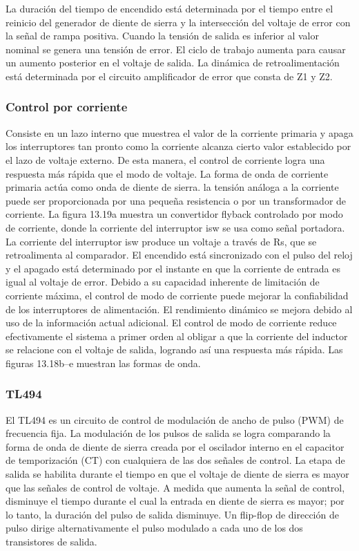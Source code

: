 La duración del tiempo de encendido está determinada por el tiempo entre el reinicio del generador de diente de sierra
y la intersección del voltaje de error con la señal de rampa positiva. 
Cuando la tensión de salida es inferior al valor nominal se genera una tensión de error. 
El ciclo de trabajo aumenta para causar un aumento posterior en el voltaje de salida. 
La dinámica de retroalimentación está determinada por el circuito amplificador de error que consta de Z1 y Z2.

\subsubsection{Control por corriente}

Consiste en un lazo interno que muestrea el valor de la corriente primaria y apaga los interruptores tan pronto como la corriente alcanza cierto valor establecido por el lazo de voltaje externo. 
De esta manera, el control de corriente logra una respuesta más rápida que el modo de voltaje. 
La forma de onda de corriente primaria actúa como onda de diente de sierra. 
la tensión análoga a la corriente puede ser proporcionada por una pequeña resistencia o por un transformador de corriente. 
La figura 13.19a muestra un convertidor flyback controlado por modo de corriente, donde la corriente del interruptor isw se usa como señal portadora. 
La corriente del interruptor isw produce un voltaje a través de Rs, que se retroalimenta al comparador. 
El encendido está sincronizado con el pulso del reloj y el apagado está determinado por el instante en que la corriente de entrada es igual al voltaje de error.
Debido a su capacidad inherente de limitación de corriente máxima, el control de modo de corriente puede mejorar la confiabilidad de los interruptores de alimentación. El rendimiento dinámico se mejora debido al uso de la información actual adicional. El control de modo de corriente reduce efectivamente el sistema a primer orden al obligar a que la corriente del inductor se relacione con el voltaje de salida, logrando así una respuesta más rápida. Las figuras 13.18b–e muestran las formas de onda.


\subsubsection{TL494}

El TL494 es un circuito de control de modulación de ancho de pulso (PWM) de frecuencia fija. 
La modulación de los pulsos de salida se logra comparando la forma de onda de diente de sierra creada por el oscilador interno en el capacitor de temporización (CT) con cualquiera de las dos señales de control. 
La etapa de salida se habilita durante el tiempo en que el voltaje de diente de sierra es mayor que las señales de control de voltaje. 
A medida que aumenta la señal de control, disminuye el tiempo durante el cual la entrada en diente de sierra es mayor; por lo tanto, la duración del pulso de salida disminuye. 
Un flip-flop de dirección de pulso dirige alternativamente el pulso modulado a cada uno de los dos transistores de salida.

